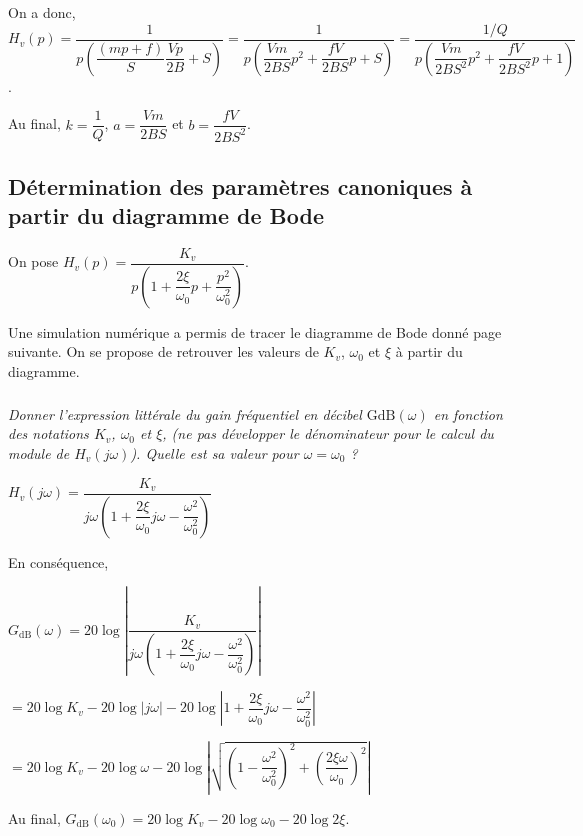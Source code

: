 \documentclass[10pt,fleqn]{article} %
\begin{document}
\begin{multicols}{2}
\begin{corrige}
On a donc, 
$H_v(p)
=\dfrac{1}{p\left(\dfrac{\left(mp+f\right)}{S} \dfrac{Vp}{2B}+S \right)}
=\dfrac{1}{p\left(\dfrac{Vm}{2BS}p^2+ \dfrac{fV}{2BS}p+S \right)}
=\dfrac{1/Q}{p\left(\dfrac{Vm}{2BS^2}p^2+ \dfrac{fV}{2BS^2}p+1 \right)}
$.

Au final, $k=\dfrac{1}{Q}$, $a=\dfrac{Vm}{2BS}$ et $b=\dfrac{fV}{2BS^2}$.
\end{corrige} \else \fi

\subsection*{Détermination des paramètres canoniques à partir du diagramme de Bode}

On pose $H_v(p)=\dfrac{K_v}{p\left( 1+\dfrac{2\xi}{\omega_0} p + \dfrac{p^2}{\omega_0^2} \right)}$. 

Une simulation numérique a permis de tracer le diagramme de Bode donné page suivante. On se propose de retrouver les valeurs de $K_v$, $\omega_0$ et $\xi$ à partir du diagramme.


\subparagraph{}\textit{Donner l'expression littérale du gain fréquentiel en décibel $\text{GdB}(\omega)$ en fonction des notations $K_v$, $\omega_0$ et $\xi$, (ne pas développer le dénominateur pour le calcul du module de $H_v(j\omega)$). Quelle est sa valeur pour $\omega=\omega_0$ ?}

\ifprof \begin{corrige}
$H_v(j\omega )=\dfrac{K_v}{j\omega\left( 1+\dfrac{2\xi}{\omega_0} j\omega - \dfrac{\omega^2}{\omega_0^2} \right)}$

En conséquence, 

$
G_{\text{dB}}\left(\omega \right)=20\log\left| \dfrac{K_v}{j\omega\left( 1+\dfrac{2\xi}{\omega_0} j\omega - \dfrac{\omega^2}{\omega_0^2} \right)} \right|
$

$
=20\log K_v- 20\log  \left| j\omega\right| - 20\log  \left| 1+\dfrac{2\xi}{\omega_0} j\omega - \dfrac{\omega^2}{\omega_0^2}  \right|
$

$
=20\log K_v- 20\log  \omega - 20\log  \left| \sqrt{\left(1- \dfrac{\omega^2}{\omega_0^2} \right)^2+\left( \dfrac{2\xi\omega }{\omega_0} \right)^2} \right|
$

Au final, 
$G_{\text{dB}}\left(\omega_0 \right)=
20\log K_v- 20\log  \omega_0 - 20\log 2\xi $.
\end{corrige} \else \fi


\end{multicols}
\end{document}
